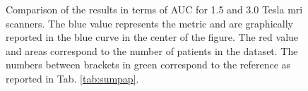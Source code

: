 \begin{figure}
{
}
\hspace*{\fill}
\caption{Comparison of the results in terms of AUC for 1.5 and 3.0 Tesla \ac{mri} scanners. The {\color{blue}blue} value represents the metric and are graphically reported in the blue curve in the center of the figure. The {\color{red}red} value and areas correspond to the number of patients in the dataset. The numbers between brackets in {\color{semiAuto}green} correspond to the reference as reported in Tab. \ref{tab:sumpap}.}
\label{fig:auc}
\end{figure}


